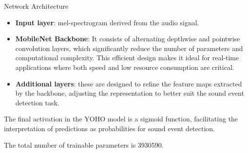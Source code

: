 	
	\begin{frame}{Network Architecture}
		\begin{itemize}
			\item \textbf{Input layer}: mel-spectrogram derived from the audio signal.
			\item \textbf{MobileNet Backbone}:  It consists of alternating depthwise and pointwise convolution layers, which significantly reduce the number of parameters and computational complexity. This efficient design makes it ideal for real-time applications where both speed and low resource consumption are critical.
			\item \textbf{Additional layers}: these are designed to refine the feature maps extracted by the backbone, adjusting the representation to better suit the sound event detection task.
		\end{itemize} 
		
		The final activation in the YOHO model is a sigmoid function, facilitating the interpretation of predictions as probabilities for sound event detection.
		
		The total number of trainable parameters is \SI{3930590}{}.
		
		\note{
			\dots
		}
	\end{frame}
	
